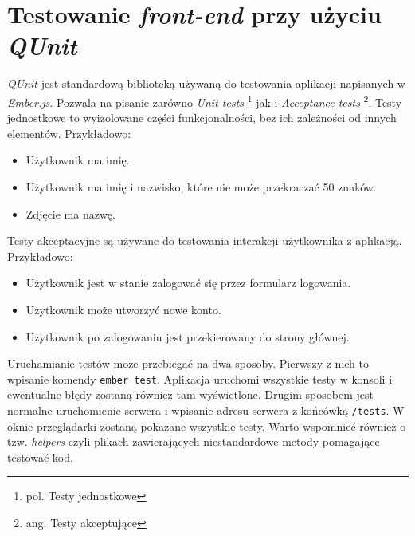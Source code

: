 \documentclass[openright]{xmgr}
\begin{document}
\section{Testowanie \textit{front-end} przy użyciu \textit{QUnit}}
\textit{QUnit} jest standardową biblioteką używaną do testowania aplikacji napisanych w \textit{Ember.js}. Pozwala na pisanie zarówno \textit{Unit tests} \footnote{pol. Testy jednostkowe} jak i \textit{Acceptance tests} \footnote{ang. Testy akceptujące}.  Testy jednostkowe to wyizolowane części funkcjonalności, bez ich zależności od innych elementów. Przykładowo:
\begin{itemize}
\item Użytkownik ma imię.
\item Użytkownik ma imię i nazwisko, które nie może przekraczać 50 znaków.
\item Zdjęcie ma nazwę.
\end{itemize}
Testy akceptacyjne są używane do testowania interakcji użytkownika z aplikacją. Przykładowo:
\begin{itemize}
\item Użytkownik jest w stanie zalogować się przez formularz logowania.
\item Użytkownik może utworzyć nowe konto.
\item Użytkownik po zalogowaniu jest przekierowany do strony głównej.
\end{itemize}
Uruchamianie testów może przebiegać na dwa sposoby. Pierwszy z nich to wpisanie komendy \verb|ember test|. Aplikacja uruchomi wszystkie testy w konsoli i ewentualne błędy zostaną również tam wyświetlone. Drugim sposobem jest normalne uruchomienie serwera i wpisanie adresu serwera z końcówką \verb|/tests|. W oknie przeglądarki zostaną pokazane wszystkie testy.
\newline \indent Warto wspomnieć również o tzw. \textit{helpers} czyli plikach zawierających niestandardowe metody pomagające testować kod.
\end{document}
